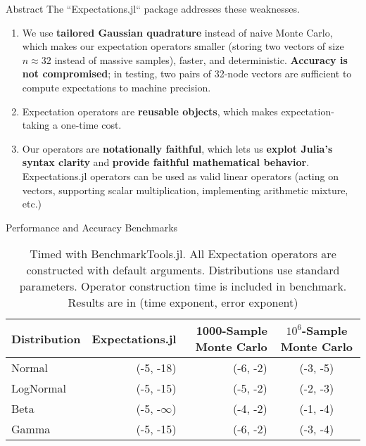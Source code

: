 \documentclass[final]{beamer}
\newlength{\colwidth}
\begin{document}
\begin{frame}[fragile]
\begin{columns}[t]
\begin{column}{\colwidth}
\begin{block}{Abstract}
    The ``Expectations.jl`` package addresses these weaknesses.
    
    \begin{enumerate}
      \item We use \textbf{tailored Gaussian quadrature} instead of naive Monte Carlo, which makes our expectation operators smaller (storing two vectors of size $n \approx 32$ instead of massive samples), faster, and deterministic. \textbf{Accuracy is not compromised}; in testing, two pairs of 32-node vectors are sufficient to compute expectations to machine precision.
      \item Expectation operators are \textbf{reusable objects}, which makes expectation-taking a one-time cost.
      \item Our operators are \textbf{notationally faithful}, which lets us \textbf{explot Julia's syntax clarity} and \textbf{provide faithful mathematical behavior}. Expectations.jl operators can be used as valid linear operators (acting on vectors, supporting scalar multiplication, implementing arithmetic mixture, etc.)
    \end{enumerate}

  \end{block}

  \begin{alertblock}{Performance and Accuracy Benchmarks}

    \begin{table}
      \centering
      \begin{tabular}{l r r c}
        \toprule
        \textbf{Distribution} & \textbf{Expectations.jl} & \textbf{1000-Sample Monte Carlo} & \textbf{$10^6$-Sample Monte Carlo} \\
        \midrule
        Normal & (-5, -18) & (-6, -2) & (-3, -5) \\
        LogNormal & (-5, -15) & (-5, -2) & (-2, -3) \\
        Beta & (-5, -$\infty$) & (-4, -2) & (-1, -4) \\
        Gamma & (-5, -15) & (-6, -2) & (-3, -4) \\
        \bottomrule
      \end{tabular}
      \caption{Timed with BenchmarkTools.jl. All Expectation operators are constructed with default arguments. Distributions use standard parameters. Operator construction time is included in benchmark. Results are in (time exponent, error exponent)}
    \end{table}

  \end{alertblock}


\end{column}
\end{columns}
\end{frame}
\end{document}
